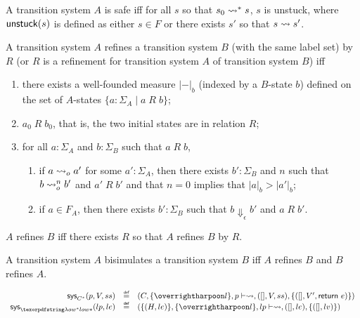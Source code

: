 \begin{definition}[Safety] \label{def-safety}
  A transition system $A$ is safe iff for all $s$ so that $s_0\leadsto^* s$, $s$ is unstuck, where $\text{\textsf{unstuck}}(s)$ is defined as either $s\in F$ or there exists $s'$ so that $s\leadsto s'$.
\end{definition}

\begin{definition}[Refinement] \label{def-refine}
  A transition system $A$ refines a transition system $B$ (with the same label set) by $R$ (or $R$ is a refinement for transition system $A$ of transition system $B$) iff
  \begin{enumerate}
  \item there exists a well-founded measure $|-|_b$ (indexed by a $B$-state $b$) defined on the set of $A$-states $\{a:\Sigma_A\;|\;a\;R\;b\}$;
  \item $a_0\;R\;b_0$, that is, the two initial states are in  relation $R$;
  \item for all $a:\Sigma_A$ and $b:\Sigma_B$ such that $a\;R\;b$,
    \begin{enumerate}
    \item if $a\leadsto_o a'$ for some $a':\Sigma_A$, then there exists $b':\Sigma_B$ and $n$ such that $b\leadsto^n_o b'$ and $a'\;R\;b'$ and that $n=0$ implies that $|a|_b>|a'|_b$;
    \item if $a\in F_A$, then there exists $b':\Sigma_B$ such that $b\Downarrow_\epsilon b'$ and $a\;R\;b'$.
    \end{enumerate}
  \end{enumerate}
  $A$ refines $B$ iff there exists $R$ so that $A$ refines $B$ by $R$.
\end{definition}

\begin{definition}[Bisimulation] \label{def-bisim}
  A transition system $A$ bisimulates a transition system $B$ iff $A$ refines $B$ and $B$ refines $A$.
\end{definition}

\begin{definition} \label{def-trsys-cstar}
  $$\begin{array}{rcl}
    \sys_{\cstar}(p,V,ss)&\defeq&(C, \{\ls{l}\}, p\vdash\step, ([], V, ss), \{([], V', \ereturn{e})\}) \\
    \sys_{\lamstar}(lp,le)&\defeq&(\{(H,le)\}, \{\ls{l}\}, lp\vdash\step, ([], le), \{([], lv)\})
  \end{array}$$
\end{definition}

